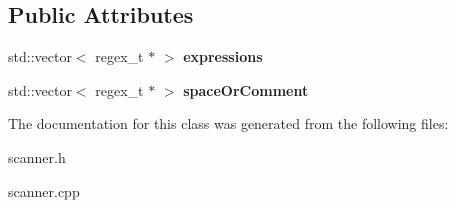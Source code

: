 \subsection*{Public Attributes}
\begin{DoxyCompactItemize}
\item 
\hypertarget{class_scanner_a2e2b865e62d926e58a16ba86c7288ea3}{}std\+::vector$<$ regex\+\_\+t $\ast$ $>$ {\bfseries expressions}\label{class_scanner_a2e2b865e62d926e58a16ba86c7288ea3}

\item 
\hypertarget{class_scanner_a2988e7836bc3fcf4b4593e82be3d50cf}{}std\+::vector$<$ regex\+\_\+t $\ast$ $>$ {\bfseries space\+Or\+Comment}\label{class_scanner_a2988e7836bc3fcf4b4593e82be3d50cf}

\end{DoxyCompactItemize}


The documentation for this class was generated from the following files\+:\begin{DoxyCompactItemize}
\item 
scanner.\+h\item 
scanner.\+cpp\end{DoxyCompactItemize}
